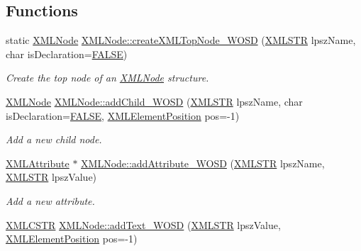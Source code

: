 \subsection*{Functions}
\begin{DoxyCompactItemize}
\item 
static \hyperlink{structXMLNode}{X\-M\-L\-Node} \hyperlink{group__xmlWOSD_ga9c8b3bfa9671cb2a0a977ef30bab364a}{X\-M\-L\-Node\-::create\-X\-M\-L\-Top\-Node\-\_\-\-W\-O\-S\-D} (\hyperlink{xmlParser_8h_a849d96105aa0c8f64b5c10d9151a3cdc}{X\-M\-L\-S\-T\-R} lpsz\-Name, char is\-Declaration=\hyperlink{xmlParser_8h_aa93f0eb578d23995850d61f7d61c55c1}{F\-A\-L\-S\-E})
\begin{DoxyCompactList}\small\item\em Create the top node of an \hyperlink{structXMLNode}{X\-M\-L\-Node} structure. \end{DoxyCompactList}\item 
\hyperlink{structXMLNode}{X\-M\-L\-Node} \hyperlink{group__xmlWOSD_ga24b13602fdff0194b087df4eaf28e703}{X\-M\-L\-Node\-::add\-Child\-\_\-\-W\-O\-S\-D} (\hyperlink{xmlParser_8h_a849d96105aa0c8f64b5c10d9151a3cdc}{X\-M\-L\-S\-T\-R} lpsz\-Name, char is\-Declaration=\hyperlink{xmlParser_8h_aa93f0eb578d23995850d61f7d61c55c1}{F\-A\-L\-S\-E}, \hyperlink{xmlParser_8h_aab10d65aadeca1f026f6416becde7432}{X\-M\-L\-Element\-Position} pos=-\/1)
\begin{DoxyCompactList}\small\item\em Add a new child node. \end{DoxyCompactList}\item 
\hyperlink{structXMLAttribute}{X\-M\-L\-Attribute} $\ast$ \hyperlink{group__xmlWOSD_ga653039c9f5fb22076a00b258284c65ee}{X\-M\-L\-Node\-::add\-Attribute\-\_\-\-W\-O\-S\-D} (\hyperlink{xmlParser_8h_a849d96105aa0c8f64b5c10d9151a3cdc}{X\-M\-L\-S\-T\-R} lpsz\-Name, \hyperlink{xmlParser_8h_a849d96105aa0c8f64b5c10d9151a3cdc}{X\-M\-L\-S\-T\-R} lpsz\-Value)
\begin{DoxyCompactList}\small\item\em Add a new attribute. \end{DoxyCompactList}\item 
\hyperlink{xmlParser_8h_acdb0d6fd8dd596384b438d86cfb2b182}{X\-M\-L\-C\-S\-T\-R} \hyperlink{group__xmlWOSD_ga90944eacfeb994486e3ca83a68c35b6a}{X\-M\-L\-Node\-::add\-Text\-\_\-\-W\-O\-S\-D} (\hyperlink{xmlParser_8h_a849d96105aa0c8f64b5c10d9151a3cdc}{X\-M\-L\-S\-T\-R} lpsz\-Value, \hyperlink{xmlParser_8h_aab10d65aadeca1f026f6416becde7432}{X\-M\-L\-Element\-Position} pos=-\/1)

\end{DoxyCompactItemize}
